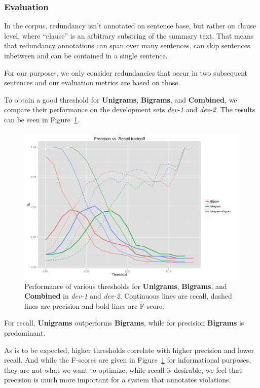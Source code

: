\documentclass[a4paper,10pt]{scrartcl}
\theoremstyle{style}
\begin{document}
\subsubsection{Evaluation}

In the corpus, redundancy isn't annotated on sentence base, but rather on clause level, where ``clause'' is an arbitrary substring of the summary text. That means that redundancy annotations can span over many sentences, can skip sentences inbetween and can be contained in a single sentence.

For our purposes, we only consider redundancies that occur in two subsequent sentences and our evaluation metrics are based on those.

To obtain a good threshold for \textbf{Unigrams}, \textbf{Bigrams}, and \textbf{Combined}, we compare their performance on the development sets \textit{dev-1} and \textit{dev-2}. The results can be seen in Figure~\ref{redundancy_graph}.

\begin{figure}
\begin{center}
\includegraphics[scale=0.15]{a.png}
\end{center}
\caption{Performance of various thresholds for \textbf{Unigrams}, \textbf{Bigrams}, and \textbf{Combined} in \textit{dev-1} and \textit{dev-2}. Continuous lines are recall, dashed lines are precision and bold lines are F-score.}
\label{redundancy_graph}
\end{figure}

For recall, \textbf{Unigrams} outperforms \textbf{Bigrams}, while for precision \textbf{Bigrams} is predominant.

As is to be expected, higher thresholds correlate with higher precision and lower recall. And while the F-scores are given in Figure~\ref{redundancy_graph} for informational purposes, they are not what we want to optimize; while recall is desirable, we feel that precision is much more important for a system that annotates violations.
\end{document}
